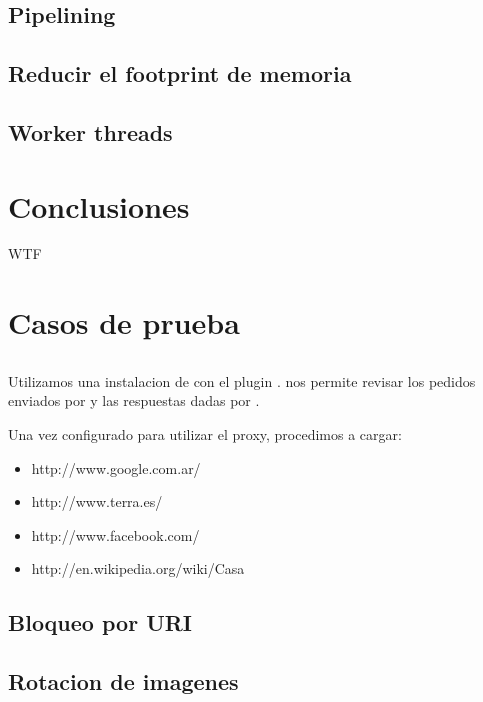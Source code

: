 \documentclass[11pt,a4paper,titlepage]{article}
\begin{document}
    \subsection{Pipelining}

    \subsection{Reducir el footprint de memoria}

    \subsection{Worker threads}

\section{Conclusiones}
    WTF

\section{Casos de prueba}
    \subsection{}
    Utilizamos una instalacion de  con el plugin .
     nos permite revisar los pedidos enviados por  y las respuestas dadas por \duta.

    Una vez configurado  para utilizar el proxy, procedimos a cargar:
    \begin{itemize}
        \item http://www.google.com.ar/
        \item http://www.terra.es/
        \item http://www.facebook.com/
        \item http://en.wikipedia.org/wiki/Casa
    \end{itemize}

    \subsection{Bloqueo por URI}

    \subsection{Rotacion de imagenes}
\end{document}
